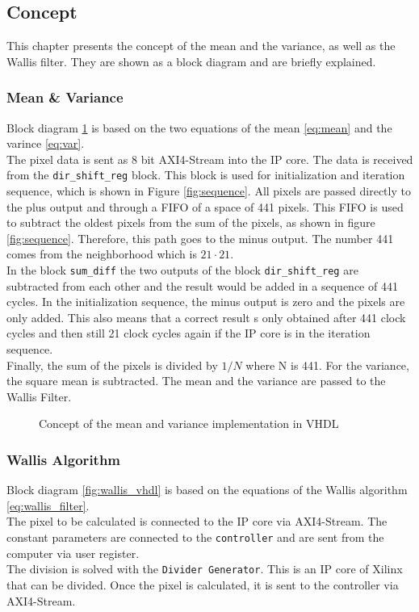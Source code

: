 \subsection{Concept} \label{ch:concept_vhdl}
This chapter presents the concept of the mean and the variance, as well as the Wallis filter. They are shown as a block diagram and are briefly explained.

\subsubsection*{Mean \& Variance}
Block diagram \ref{fig:mean_var_vhdl} is based on the two equations of the mean \ref{eq:mean} and the varince \ref{eq:var}. \\
The pixel data is sent as 8 bit AXI4-Stream into the IP core. The data is received from the \texttt{dir\_shift\_reg} block. This block is used for initialization and iteration sequence, which is shown in Figure \ref{fig:sequence}. All pixels are passed directly to the plus output and through a FIFO of a space of 441 pixels. This FIFO is used to subtract the oldest pixels from the sum of the pixels, as shown in figure \ref{fig:sequence}. Therefore, this path goes to the minus output. The number 441 comes from the neighborhood which is $21 \cdot 21$. \\
In the block \texttt{sum\_diff} the two outputs of the block \texttt{dir\_shift\_reg} are subtracted from each other and the result would be added in a sequence of 441 cycles. In the initialization sequence, the minus output is zero and the pixels are only added. This also means that a correct result s only obtained after 441 clock cycles and then still 21 clock cycles again if the IP core is in the iteration sequence. \\
Finally, the sum of the pixels is divided by $1/N$ where N is 441. For the variance, the square mean is subtracted. The mean and the variance are passed to the Wallis Filter.

\begin{figure}[tb!]
    \centering
    \begin{adjustbox}{max width=\textwidth, keepaspectratio}
        
    \end{adjustbox}
    \caption{Concept of the mean and variance implementation in VHDL}
    \label{fig:mean_var_vhdl}
\end{figure}

\subsubsection*{Wallis Algorithm}
Block diagram \ref{fig:wallis_vhdl} is based on the equations of the Wallis algorithm \ref{eq:wallis_filter}. \\
The pixel to be calculated is connected to the IP core via AXI4-Stream. The constant parameters are connected to the \texttt{controller} and are sent from the computer via user register. \\
The division is solved with the \texttt{Divider Generator}. This is an IP core of Xilinx that can be divided. Once the pixel is calculated, it is sent to the controller via AXI4-Stream.


